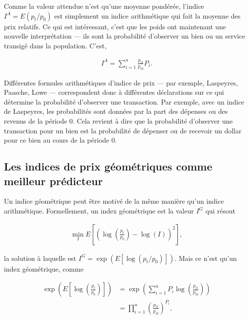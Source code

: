 \documentclass[
]{article}
\begin{document}
Comme la valeur attendue n'est qu'une moyenne pondérée, l'indice \(I^{A} = E(p_{t} / p_{0})\) est simplement un indice arithmétique qui fait la moyenne des prix relatifs. Ce qui est intéressant, c'est que les poids ont maintenant une nouvelle interprétation --- ils sont la probabilité d'observer un bien ou un service transigé dans la population. C'est,

\begin{align*}
I^{A} = \sum_{i = 1}^{n} \frac{p_{it}}{p_{i0}} P_{i}.
\end{align*}

Différentes formules arithmétiques d'indice de prix --- par exemple, Laspeyres, Paasche, Lowe --- correspondent donc à différentes déclarations sur ce qui détermine la probabilité d'observer une transaction. Par exemple, avec un indice de Laspeyres, les probabilités sont données par la part des dépenses ou des revenus de la période 0. Cela revient à dire que la probabilité d'observer une transaction pour un bien est la probabilité de dépenser ou de recevoir un dollar pour ce bien au cours de la période 0.

\hypertarget{les-indices-de-prix-guxe9omuxe9triques-comme-meilleur-pruxe9dicteur}{%
\subsection{Les indices de prix géométriques comme meilleur prédicteur}\label{les-indices-de-prix-guxe9omuxe9triques-comme-meilleur-pruxe9dicteur}}

Un indice géométrique peut être motivé de la même manière qu'un indice arithmétique. Formellement, un index géométrique est la valeur \(I^{G}\) qui résout

\begin{align*}
\min_{I} E\left[\left(\log\left(\frac{p_{t}} {p_{0}} \right) - \log(I) \right)^{2} \right] ,
\end{align*}

la solution à laquelle est \(I^{G} = \exp(E[\log (p_{t} / p_{0})])\). Mais ce n'est qu'un index géométrique, comme

\begin{align*}
\exp\left(E\left[\log \left(\frac{p_{t}} {p_{0}} \right) \right] \right) & = \exp \left(\sum_{i = 1}^{n} P_{i} \log \left(\frac{p_{it}} {p_{i0}} \right) \right) \\
&= \prod_{i = 1}^{n} \left(\frac{p_{it}}{p_{i0}} \right)^{P_{i}},
\end{align*}
\end{document}
